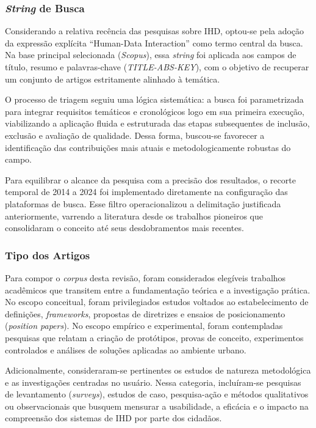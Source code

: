 \documentclass[
	12pt,				%
	oneside,			%
	a4paper,			%
	english,			%
	brazil				%
	]{abntex2ppgsi}
\begin{document}
   \subsubsection{\textit{String} de Busca}

    Considerando a relativa recência das pesquisas sobre IHD, optou-se pela adoção da expressão explícita ``Human-Data Interaction'' como termo central da busca. Na base principal selecionada (\emph{Scopus}), essa \textit{string} foi aplicada aos campos de título, resumo e palavras-chave (\textit{TITLE-ABS-KEY}), com o objetivo de recuperar um conjunto de artigos estritamente alinhado à temática.

    O processo de triagem seguiu uma lógica sistemática: a busca foi parametrizada para integrar requisitos temáticos e cronológicos logo em sua primeira execução, viabilizando a aplicação fluida e estruturada das etapas subsequentes de inclusão, exclusão e avaliação de qualidade. Dessa forma, buscou-se favorecer a identificação das contribuições mais atuais e metodologicamente robustas do campo.

    Para equilibrar o alcance da pesquisa com a precisão dos resultados, o recorte temporal de 2014 a 2024 foi implementado diretamente na configuração das plataformas de busca. Esse filtro operacionalizou a delimitação justificada anteriormente, varrendo a literatura desde os trabalhos pioneiros que consolidaram o conceito até seus desdobramentos mais recentes.

    \subsubsection{Tipo dos Artigos}

    Para compor o \textit{corpus} desta revisão, foram considerados elegíveis trabalhos acadêmicos que transitem entre a fundamentação teórica e a investigação prática. No escopo conceitual, foram privilegiados estudos voltados ao estabelecimento de definições, \textit{frameworks}, propostas de diretrizes e ensaios de posicionamento (\textit{position papers}). No escopo empírico e experimental, foram contempladas pesquisas que relatam a criação de protótipos, provas de conceito, experimentos controlados e análises de soluções aplicadas ao ambiente urbano.

    Adicionalmente, consideraram-se pertinentes os estudos de natureza metodológica e as investigações centradas no usuário. Nessa categoria, incluíram-se pesquisas de levantamento (\textit{surveys}), estudos de caso, pesquisa-ação e métodos qualitativos ou observacionais que busquem mensurar a usabilidade, a eficácia e o impacto na compreensão dos sistemas de IHD por parte dos cidadãos.
\end{document}
